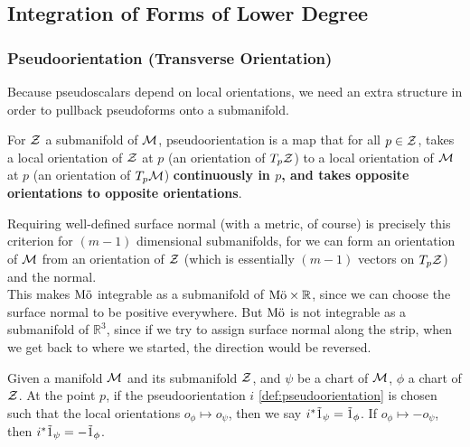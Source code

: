 \documentclass[../main.tex]{subfiles}
\begin{document}
    \subsection{Integration of Forms of Lower Degree}
    \subsubsection{Pseudoorientation (Transverse Orientation)}
    \begin{remark}
        Because pseudoscalars depend on local orientations, we need an extra 
        structure in order to pullback pseudoforms onto a submanifold.
    \end{remark}
    \begin{definition}[Pseudoorientation]\label{def:pseudoorientation}
        For \(\manifold[Z]\) a submanifold of \(\manifold[M]\), pseudoorientation is 
        a map that for all \(p \in \manifold[Z]\), takes a local orientation of 
        \(\manifold[Z]\) at \(p\) (an orientation of \(T_p\manifold[Z]\)) to a local 
        orientation of \(\manifold[M]\) at \(p\) (an orientation of 
        \(T_p\manifold[M]\)) 
        \textbf{continuously in \(p\), and takes opposite orientations 
        to opposite orientations}.
    \end{definition}
    \begin{remark}
        Requiring well-defined surface normal (with a metric, of course) is precisely 
        this criterion for \((m-1)\) dimensional submanifolds, for we can form an 
        orientation of \(\manifold[M]\) from an orientation of \(\manifold[Z]\) (which 
        is essentially \((m-1)\) vectors on \(T_p\manifold[Z]\)) and the normal.\\
        This makes \(\textnormal{M{\"o}}\) integrable as a submanifold of 
        \(\textnormal{M{\"o}}\times \mathbb{R}\), since we can choose the surface normal 
        to be positive everywhere. But \(\textnormal{M{\"o}}\) is not integrable as a 
        submanifold of \(\mathbb{R}^3\), since if we try to assign surface normal 
        along the strip, when we get back to where we started, the direction would be 
        reversed.
    \end{remark}
    \newpage
    \begin{definition}\label{def:pullback-pseudoscalar}
        Given a manifold \(\manifold[M]\) and its submanifold \(\manifold[Z]\), 
        and \(\psi\) be a chart of \(\manifold[M]\), \(\phi\) a chart of 
        \(\manifold[Z]\). At the point \(p\), if the pseudoorientation \(i\)
        \cref{def:pseudoorientation} is chosen such that the local orientations 
        \(o_\phi \mapsto o_\psi\), then we say \(i^*\pseudo{1}_\psi = 
        \pseudo{1}_\phi\). If \(o_\phi \mapsto -o_\psi\), then \(i^*\pseudo{1}_\psi = 
        -\pseudo{1}_\phi\).
    \end{definition}
\end{document}

